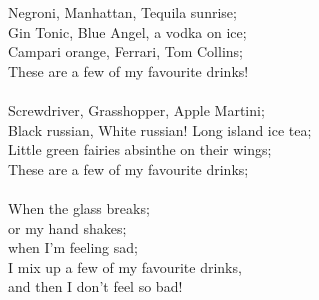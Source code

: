 
            Negroni, Manhattan, Tequila sunrise; \\
            Gin Tonic, Blue Angel, a vodka on ice; \\
            Campari orange, Ferrari, Tom Collins; \\
            These are a few of my favourite drinks! \\
\hspace{10mm} \\
            Screwdriver, Grasshopper, Apple Martini; \\
            Black russian, White russian! Long island ice tea; \\
            Little green fairies absinthe on their wings; \\
            These are a few of my favourite drinks; \\
\hspace{10mm} \\
            When the glass breaks; \\
            or my hand shakes; \\
            when I'm feeling sad; \\
            I mix up a few of my favourite drinks, \\
            and then I don't feel so bad! \\
